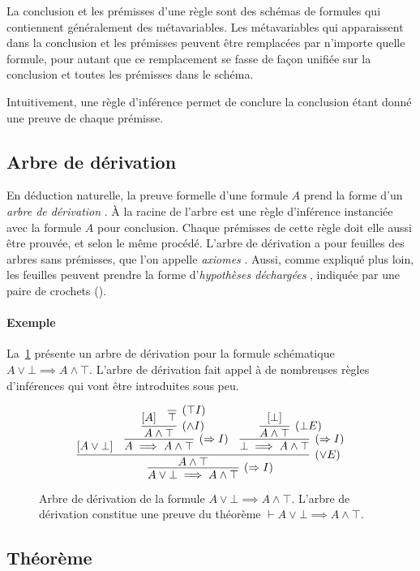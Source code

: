 La conclusion et les prémisses d'une règle sont des schémas de formules qui contiennent généralement des métavariables.
Les métavariables qui apparaissent dans la conclusion et les prémisses peuvent être remplacées par n'importe quelle formule, pour autant que ce remplacement se fasse de façon unifiée sur la conclusion et toutes les prémisses dans le schéma.

Intuitivement, une règle d'inférence permet de conclure la conclusion étant donné une preuve de chaque prémisse.

\subsection{Arbre de dérivation}

En déduction naturelle, la preuve formelle d'une formule $A$ prend la forme d'un \og \textit{arbre de dérivation} \fg.
À la racine de l'arbre est une règle d'inférence instanciée avec la formule $A$ pour conclusion.
Chaque prémisses de cette règle doit elle aussi être prouvée, et selon le même procédé.
L'arbre de dérivation a pour feuilles des arbres sans prémisses, que l'on appelle \og \textit{axiomes} \fg{}.
Aussi, comme expliqué plus loin, les feuilles peuvent prendre la forme d'\og \textit{hypothèses déchargées} \fg{}, indiquée par une paire de crochets (\og [ \fg{} et \og ] \fg{}).

\paragraph{Exemple} La~\cref{fig_arbre_derivation} présente un arbre de dérivation pour la formule schématique $A \vee \bot \implies A \wedge \top$. L'arbre de dérivation fait appel à de nombreuses règles d'inférences qui vont être introduites sous peu.

\begin{figure}[h]
\[
\infer[({\Rightarrow{}}I)]{A \vee \bot \implies A \wedge \top}{%
\infer[({\vee}E)]{A \wedge \top}{[A \vee \bot] &%
\infer[({\Rightarrow{}}I)]{A \implies A \wedge \top}{%
\infer[({\wedge{}}I)]{A \wedge \top}{[A] & \infer[({\top}I)]{\top}{}}} &%
\infer[({\Rightarrow{}}I)]{\bot \implies A \wedge \top}{%
\infer[({\bot}E)]{A \wedge \top}{[\bot]}}}}
\]
\caption{Arbre de dérivation de la formule $A \vee \bot \implies A \wedge \top$. L'arbre de dérivation constitue une preuve du théorème $\vdash A \vee \bot \implies A \wedge \top$.}
\label{fig_arbre_derivation}
\end{figure}

\subsection{Théorème}

